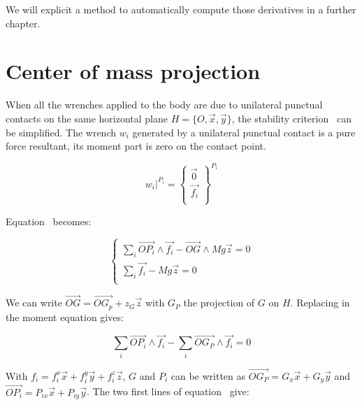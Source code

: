 We will explicit a method to automatically compute those derivatives in a further chapter.



\section{Center of mass projection}
\label{sec:center_of_mass_projection}


When all the wrenches applied to the body are due to unilateral punctual contacts on the same horizontal plane $H = \{O, \vec{x}, \vec{y}\}$, the stability criterion~ can be simplified.
The wrench $w_i$ generated by a unilateral punctual contact is a pure force resultant, its moment part is zero on the contact point.

\begin{equation*}
    \left. w_i \right|^{P_i} =
    \left\{
      \begin{array}{r}
      \vec{0}\\
      \vec{f_i}\\
  \end{array} \right\}^{P_i}
\end{equation*}

Equation~ becomes:

\begin{equation}
\left\{
\begin{array}{r}
  \sum\limits_i \overrightarrow{OP_i}\wedge \vec{f_i} - \overrightarrow{OG} \wedge Mg\vec{z} = 0 \\
  \sum\limits_i \vec{f_i} - Mg\vec{z} = 0 \\
\end{array}
\right.
\end{equation}

We can write $\overrightarrow{OG} = \overrightarrow{OG_p} + z_G\vec{z}$ with $G_P$ the projection of $G$ on $H$. Replacing in the moment equation gives:

\begin{equation}
  \sum\limits_i \overrightarrow{OP_i}\wedge \vec{f_i} - \sum\limits_i\overrightarrow{OG_P} \wedge \vec{f_i} = 0
\label{eq:projCoM}
\end{equation}

With $f_i = f_i^x\vec{x} + f_i^y\vec{y} + f_i^z\vec{z}$, $G$ and $P_i$ can be written as $\overrightarrow{OG_P} = G_x \vec{x} + G_y\vec{y}$ and $\overrightarrow{OP_i} = P_{ix} \vec{x} + P_{iy} \vec{y}$. The two first lines of equation~ give:

